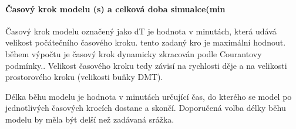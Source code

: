 \paragraph{Časový krok modelu (s) a celková doba simualce(min} \label{sec:vstupkrok}

Časový krok modelu označený jako \acs{dT} je hodnota v minutách, která udává velikost počátečního časového kroku. tento zadaný kro je maximální hodnout. během výpočtu je časový krok dynamicky zkracován podle Courantovy podmínky.. Velikost časového kroku tedy závisí na rychlosti děje a na velikosti prostorového kroku (velikosti buňky DMT). %

Délka běhu modelu je hodnota v minutách určující čas, do kterého se model po jednotlivých časových krocích dostane a skončí. Doporučená volba délky běhu modelu by měla být delší než zadávaná srážka.
 





